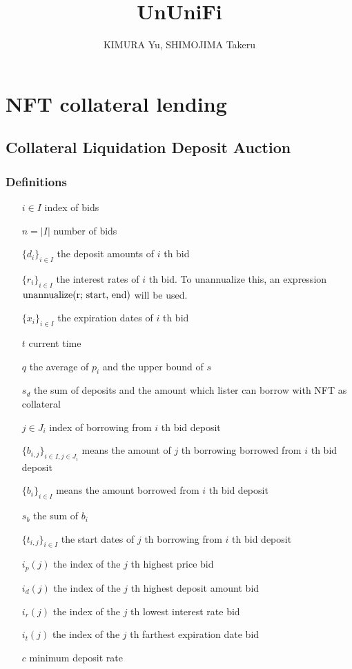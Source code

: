 \documentclass[dvipdfmx]{jsarticle}
\title{UnUniFi}
\author{KIMURA Yu, SHIMOJIMA Takeru}
\begin{document}

\maketitle

\section{NFT collateral lending}

\subsection{Collateral Liquidation Deposit Auction}

\subsubsection{Definitions}

\begin{itemize}
  \item[$i \in I$] index of bids
  \item[$n = |I|$] number of bids
  \item[$\{d_i\}_{i \in I}$] the deposit amounts of $i$ th bid
  \item[$\{r_i\}_{i \in I}$] the interest rates of $i$ th bid. To unannualize this, an expression $\text{unannualize(r; \text{start}, \text{end})}$ will be used.
  \item[$\{x_i\}_{i \in I}$] the expiration dates of $i$ th bid
  \item[$t$] current time 
  \item[$q$] the average of $p_i$ and the upper bound of $s$
  \item[$s_d$] the sum of deposits and the amount which lister can borrow with NFT as collateral
  \item[$j \in J_i$] index of borrowing from $i$ th bid deposit 
  \item[$\{b_{i,j}\}_{i \in I, j \in J_i}$] means the amount of $j$ th borrowing borrowed from $i$ th bid deposit
  \item[$\{b_i\}_{i \in I}$] means the amount borrowed from $i$ th bid deposit
  \item[$s_b$] the sum of $b_i$
  \item[$\{t_{i,j}\}_{i \in I}$] the start dates of $j$ th borrowing from $i$ th bid deposit
  \item[$i_p(j)$] the index of the $j$ th highest price bid
  \item[$i_d(j)$] the index of the $j$ th highest deposit amount bid
  \item[$i_r(j)$] the index of the $j$ th lowest interest rate bid
  \item[$i_t(j)$] the index of the $j$ th farthest expiration date bid
  \item[$c$] minimum deposit rate
\end{itemize}
\end{document}
